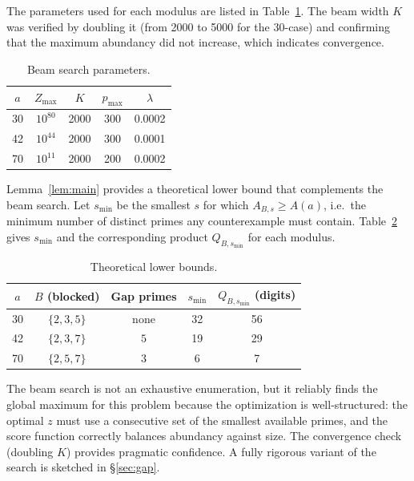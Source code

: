 \documentclass[12pt]{amsart}
\theoremstyle{definition}
\begin{document}
The parameters used for each modulus are listed in Table~\ref{tab:params}.
The beam width $K$ was verified by doubling it (from 2000 to 5000 for the
30-case) and confirming that the maximum abundancy did not increase, which
indicates convergence.

\begin{table}[h]
\centering
\caption{Beam search parameters.}
\label{tab:params}
\begin{tabular}{c|c|c|c|c}
\hline
$a$ & $Z_{\max}$ & $K$ & $p_{\max}$ & $\lambda$ \\
\hline
30 & $10^{80}$ & 2000 & 300 & 0.0002 \\
42 & $10^{44}$ & 2000 & 300 & 0.0001 \\
70 & $10^{11}$ & 2000 & 200 & 0.0002 \\
\hline
\end{tabular}
\end{table}

Lemma~\ref{lem:main} provides a theoretical lower bound that complements the
beam search.  Let $s_{\min}$ be the smallest $s$ for which
$A_{B,s} \ge A(a)$, i.e.\ the minimum number of distinct primes any
counterexample must contain.  Table~\ref{tab:search} gives $s_{\min}$ and the
corresponding product $Q_{B,s_{\min}}$ for each modulus.

\begin{table}[h]
\centering
\caption{Theoretical lower bounds.}
\label{tab:search}
\begin{tabular}{c|c|c|c|c}
\hline
$a$ & $B$ (blocked) & Gap primes & $s_{\min}$ & $Q_{B,s_{\min}}$ (digits) \\
\hline
30 & $\{2,3,5\}$ & none    & 32 & 56 \\
42 & $\{2,3,7\}$ & $5$      & 19 & 29 \\
70 & $\{2,5,7\}$ & $3$      &  6 &  7 \\
\hline
\end{tabular}
\end{table}

The beam search is not an exhaustive enumeration, but it reliably finds the
global maximum for this problem because the optimization is well-structured:
the optimal $z$ must use a consecutive set of the smallest available primes,
and the score function correctly balances abundancy against size.  The
convergence check (doubling $K$) provides pragmatic confidence.  A fully
rigorous variant of the search is sketched in \S\ref{sec:gap}.

\end{document}

